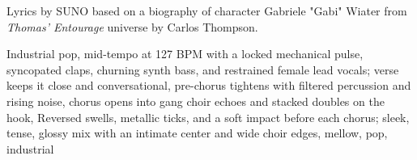 
\begin{notes}
Lyrics by SUNO based on a biography of character Gabriele "Gabi" Wiater from \emph{Thomas’ Entourage} universe by Carlos Thompson.
\end{notes}
\begin{style}
Industrial pop, mid-tempo at 127 BPM with a locked mechanical pulse, syncopated claps, churning synth bass, and restrained female lead vocals; verse keeps it close and conversational, pre-chorus tightens with filtered percussion and rising noise, chorus opens into gang choir echoes and stacked doubles on the hook, Reversed swells, metallic ticks, and a soft impact before each chorus; sleek, tense, glossy mix with an intimate center and wide choir edges, mellow, pop, industrial
\end{style}

